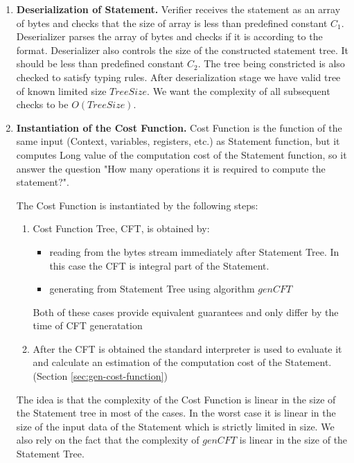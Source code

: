 \documentclass[11pt]{article}
\begin{document}
\begin{enumerate}
\item \textbf{Deserialization of Statement.}
Verifier receives the statement as an array of bytes and checks that the size
of array is less than predefined constant $C_1$. Deserializer parses the
array of bytes and checks if it is according to the format. Deserializer also
controls the size of the constructed statement tree. It should be less than
predefined constant $C_2$. The tree being constricted is also checked to
satisfy typing rules. After deserialization stage we have valid tree of known
limited size $TreeSize$. We want the complexity of all subsequent checks to
be $O(TreeSize)$.

\item \textbf{Instantiation of the Cost Function.}
Cost Function is the function of the same input (Context, variables,
registers, etc.) as Statement function, but it computes Long value of the
computation cost of the Statement function, so it answer the question "How
many operations it is required to compute the statement?". 

The Cost Function is instantiated by the following steps:
    \begin{enumerate}
        \item Cost Function Tree, CFT, is obtained by:
        \begin{itemize}
            \item reading from the bytes stream immediately after Statement
            Tree. In this case the CFT is integral part of the Statement.
            \item generating from Statement Tree using algorithm $genCFT$
        \end{itemize}
        Both of these cases provide equivalent guarantees and only differ by
        the time of CFT generatation
        \item After the CFT is obtained the standard interpreter is used to
        evaluate it and calculate an estimation of the computation cost of
        the Statement. (Section \ref{sec:gen-cost-function})
    \end{enumerate}

 The idea is that the complexity of the Cost Function is linear in the size
 of the Statement tree in most of the cases. In the worst case it is linear
 in the size of the input data of the Statement which is strictly limited in
 size.
 We also rely on the fact that the complexity of $genCFT$ is linear in the
 size of the Statement Tree.


\end{enumerate}
\end{document}

